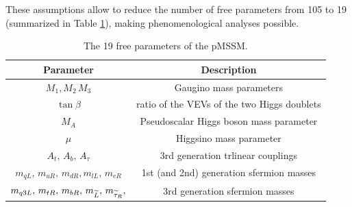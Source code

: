 These assumptions allow to reduce the number of free parameters from 105 to 19 (summarized in Table \ref{tab:pMMSpar}), making phenomenological analyses possible.


\begin{table}[h]
\centering
\begin{tabular}{c c}
\hline 
Parameter & Description \\ 
\hline 
\hline
$M_1, M_2  \, M_3 $ & Gaugino mass parameters \\ 
\hline 
$\tan \beta$ & ratio of the VEVs of the two Higgs doublets \\ 
\hline 
$M_A$ & Pseudoscalar Higgs boson mass parameter \\ 
\hline 
$\mu$ & Higgsino mass parameter \\ 
\hline 
$  A_t, \, A_b, \, A_\tau    $ & 3rd generation trlinear couplings \\ 
\hline 
$m_{qL},  \,  m_{uR},  \, m_{dR},  m_{lL},  \, m_{eR}$ & 1st (and 2nd) generation sfermion masses \\ 
\hline 
 $m_{q3L}, \, m_{tR}, \, m_{bR}, \, m_{\widetilde{L}}, \, m_{\widetilde{\tau}_R},$ & 3rd generation sfermion masses \\ 
\hline 
\end{tabular} 
\caption[Free parameters of the pMSSM]{\label{tab:pMMSpar}The 19 free parameters of the pMSSM.}
\end{table}






